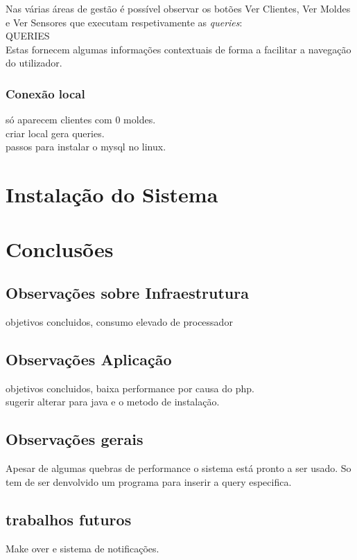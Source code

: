 \documentclass[11pt,twoside,a4paper]{report}
\begin{document}
Nas várias áreas de gestão é possível observar os botões Ver Clientes, Ver Moldes e Ver Sensores que executam respetivamente as \textit{queries}:\\
QUERIES\\
Estas fornecem algumas informações contextuais de forma a facilitar a navegação do utilizador.

\subsection{Conexão local}
só aparecem clientes com 0 moldes.\\
criar local gera queries.\\
passos para instalar o mysql no linux.


\cleardoublepage
\chapter{Instalação do Sistema}

\cleardoublepage
\chapter{Conclusões}
\section{Observações sobre Infraestrutura}
objetivos concluidos, consumo elevado de processador

\section{Observações Aplicação}
objetivos concluidos, baixa performance por causa do php.\\
sugerir alterar para java e o metodo de instalação.

\section{Observações gerais}
Apesar de algumas quebras de performance o sistema está pronto a ser usado. So tem de ser denvolvido um programa para inserir a query especifica.

\section{trabalhos futuros}
Make over e sistema de notificações.
\end{document}
